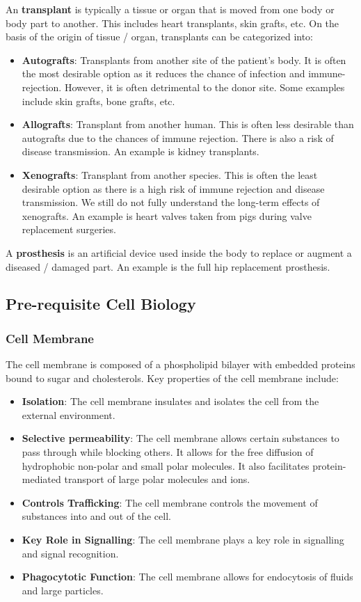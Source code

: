 \documentclass[12pt]{article}
\begin{document}
An \textbf{transplant} is typically a tissue or organ that is moved from one
body or body part to another. This includes heart transplants, skin grafts,
etc. On the basis of the origin of tissue / organ, transplants can be
categorized into:
\begin{itemize}
    \item \textbf{Autografts}: Transplants from another site of the patient's body. It is often the most desirable option as it reduces the chance of infection and immune-rejection. However, it is often detrimental to the donor site. Some examples include skin grafts, bone grafts, etc.
    \item \textbf{Allografts}: Transplant from another human. This is often less desirable than autografts due to the chances of immune rejection. There is also a risk of disease transmission. An example is kidney transplants.
    \item \textbf{Xenografts}: Transplant from another species. This is often the least desirable option as there is a high risk of immune rejection and disease transmission. We still do not fully understand the long-term effects of xenografts. An example is heart valves taken from pigs during valve replacement surgeries.
\end{itemize}

A \textbf{prosthesis} is an artificial device used inside the body to replace
or augment a diseased / damaged part. An example is the full hip replacement
prosthesis.
\subsection{Pre-requisite Cell Biology}
\subsubsection{Cell Membrane}
The cell membrane is composed of a phospholipid bilayer with embedded proteins
bound to sugar and cholesterols. Key properties of the cell membrane include:
\sloppy
\begin{itemize}
    \item \textbf{Isolation}: The cell membrane insulates and isolates the cell from the external environment.
    \item \textbf{Selective permeability}: The cell membrane allows certain substances to pass through while blocking others. It allows for the free diffusion of hydrophobic non-polar and small polar molecules. It also facilitates protein-mediated transport of large polar molecules and ions.
    \item \textbf{Controls Trafficking}: The cell membrane controls the movement of substances into and out of the cell.
    \item \textbf{Key Role in Signalling}: The cell membrane plays a key role in signalling and signal recognition.
    \item \textbf{Phagocytotic Function}: The cell membrane allows for endocytosis of fluids and large particles.
\end{itemize}
\end{document}
